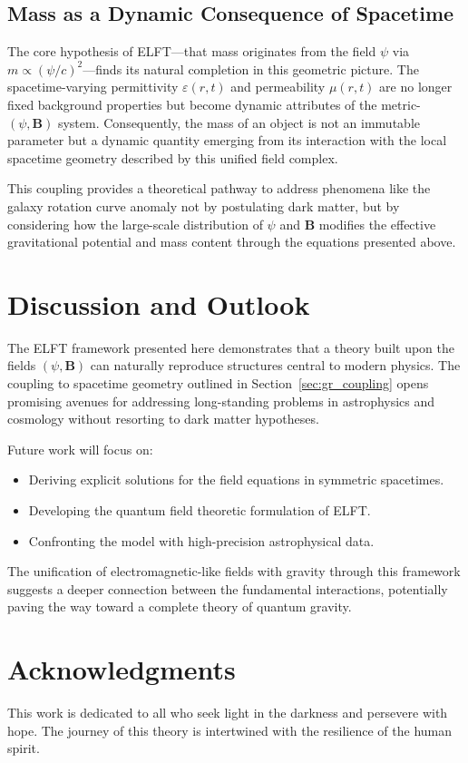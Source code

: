 \documentclass[12pt, a4paper]{article}
\begin{document}
\subsection{Mass as a Dynamic Consequence of Spacetime}
The core hypothesis of ELFT—that mass originates from the field $\psi$ via $m \propto (\psi/c)^2$—finds its natural completion in this geometric picture. The spacetime-varying permittivity $\varepsilon(r,t)$ and permeability $\mu(r,t)$ are no longer fixed background properties but become dynamic attributes of the metric-$(\psi, \mathbf{B})$ system. Consequently, the mass of an object is not an immutable parameter but a dynamic quantity emerging from its interaction with the local spacetime geometry described by this unified field complex.

This coupling provides a theoretical pathway to address phenomena like the galaxy rotation curve anomaly not by postulating dark matter, but by considering how the large-scale distribution of $\psi$ and $\mathbf{B}$ modifies the effective gravitational potential and mass content through the equations presented above.

\section{Discussion and Outlook}
The ELFT framework presented here demonstrates that a theory built upon the fields $(\psi, \mathbf{B})$ can naturally reproduce structures central to modern physics. The coupling to spacetime geometry outlined in Section~\ref{sec:gr_coupling} opens promising avenues for addressing long-standing problems in astrophysics and cosmology without resorting to dark matter hypotheses.

Future work will focus on:
\begin{itemize}
    \item Deriving explicit solutions for the field equations in symmetric spacetimes.
    \item Developing the quantum field theoretic formulation of ELFT.
    \item Confronting the model with high-precision astrophysical data.
\end{itemize}

The unification of electromagnetic-like fields with gravity through this framework suggests a deeper connection between the fundamental interactions, potentially paving the way toward a complete theory of quantum gravity.

\section*{Acknowledgments}
This work is dedicated to all who seek light in the darkness and persevere with hope. The journey of this theory is intertwined with the resilience of the human spirit.
\end{document}
